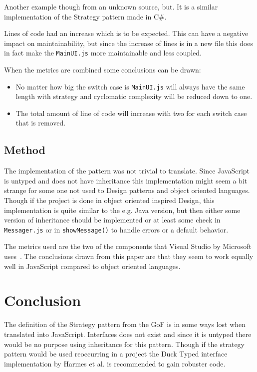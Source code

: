 \documentclass[conference, a4paper]{IEEEtran}
\begin{document}
Another example though from an unknown source, but. It is a similar implementation of the Strategy pattern made in C\#.~\cite{bibitem:CSharp}

Lines of code had an increase which is to be expected. This can have a negative impact on maintainability, but since the increase of lines is in a new file this does in fact make the \texttt{MainUI.js} more maintainable and less coupled.

When the metrics are combined some conclusions can be drawn:
\begin{itemize}
	\item No matter how big the switch case is \texttt{MainUI.js} will always have the same length with strategy and cyclomatic complexity will be reduced down to one.
	\item The total amount of line of code will increase with two for each switch case that is removed.
\end{itemize}

\subsection{Method}
The implementation of the pattern was not trivial to translate. Since JavaScript is untyped and does not have inheritance this implementation might seem a bit strange for some one not used to Design patterns and object oriented languages. Though if the project is done in object oriented inspired Design, this implementation is quite similar to the e.g. Java version, but then either some version of inheritance should be implemented or at least some check in \texttt{Messager.js} or in \texttt{showMessage()} to handle errors or a default behavior.

The metrics used are the two of the components that Visual Studio by Microsoft uses~\cite{bibitem:MI}. The conclusions drawn from this paper are that they seem to work equally well in JavaScript compared to object oriented languages.

\section{Conclusion}
The definition of the Strategy pattern from the GoF is in some ways lost when translated into JavaScript. Interfaces does not exist and since it is untyped there would be no purpose using inheritance for this pattern. Though if the strategy pattern would be used reoccurring in a project the Duck Typed interface implementation by Harmes et al. is recommended to gain robuster code.~\cite{bibitem:DiazHarmes}
\end{document}
